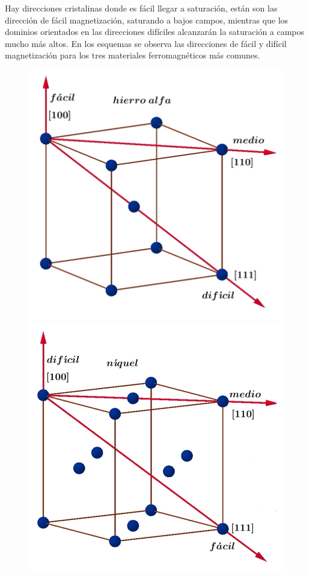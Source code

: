 Hay direcciones cristalinas donde es fácil llegar a saturación, están son las dirección de fácil magnetización, saturando a bajos campos, mientras que los dominios orientados en las direcciones difíciles alcanzarán la saturación a campos mucho más altos. En los esquemas se observa las direcciones de fácil y difícil magnetización para los tres materiales ferromagnéticos más comunes.

\begin{figure}[H]
  \centering
  \begin{minipage}[b]{0.47\textwidth}
    \raggedright
     \includegraphics[width=1.10\textwidth]{./Figures/policristalino1}
  \end{minipage}
  \hfill
  \begin{minipage}[b]{0.47\textwidth}
    \raggedleft
     \includegraphics[width=1.10\textwidth]{./Figures/policristalino2}

\end{minipage}
\end{figure}
